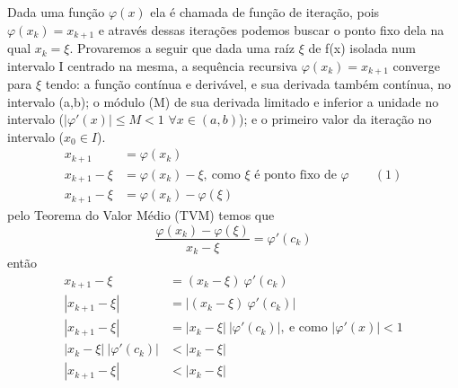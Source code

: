Dada uma função $\varphi(x)$ ela é chamada de função de iteração, pois $\varphi(x_k) = x_{k+1}$ e através dessas iterações podemos buscar o ponto fixo dela na qual $x_k = \xi$. Provaremos a seguir que dada uma raíz $\xi$ de f(x) isolada num intervalo I centrado na mesma, a sequência recursiva $\varphi(x_k) = x_{k+1}$ converge para $\xi$ tendo: a função contínua e derivável, e sua derivada também contínua, no intervalo (a,b); o módulo (M) de sua derivada limitado e inferior a unidade no intervalo ($|\varphi'(x)| \leq M < 1$ $\forall x \in (a, b)$); e o primeiro valor da iteração no intervalo ($x_0 \in I$).
\begin{align*}
    x_{k+1} &= \varphi(x_k) \\
    x_{k+1} - \xi &= \varphi(x_k) - \xi, \ \text{como $\xi$ é ponto fixo de $\varphi$} \qquad (1)\\
    x_{k+1} - \xi &= \varphi(x_k) - \varphi(\xi)
\end{align*}
pelo Teorema do Valor Médio (TVM) temos que
\begin{equation}
    \frac{\varphi(x_k) - \varphi(\xi)}{x_k - \xi} = \varphi'(c_k) \label{tvm}
\end{equation}
então
\begin{align*}
    x_{k+1} - \xi &= (x_k - \xi) \ \varphi'(c_k) \\
    |x_{k+1} - \xi| &= |(x_k - \xi) \ \varphi'(c_k)| \\
    |x_{k+1} - \xi| &= |x_k - \xi| \ |\varphi'(c_k)|, \ \text{e como $|\varphi'(x)| < 1$} \\
    |x_k - \xi| \ |\varphi'(c_k)| &< |x_k - \xi| \\
    |x_{k+1} - \xi| &< |x_k - \xi| 
\end{align*}


